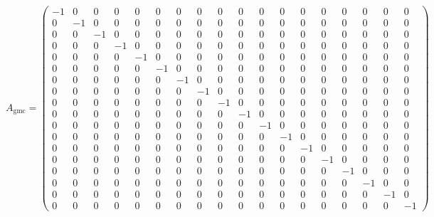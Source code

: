 \begin{landscape}
  \enlargethispage{55pt}
  \begin{equation}
    A_{\mathrm{gmc}}=\left(\begin{array}{rrrrrrrrrrrrrrrrrrrrrrrrrrrrrr}
        -1 & 0 & 0 & 0 & 0 & 0 & 0 & 0 & 0 & 0 & 0 & 0 & 0 & 0 & 0 & 0 & 0 & 0 \\
        0 & -1 & 0 & 0 & 0 & 0 & 0 & 0 & 0 & 0 & 0 & 0 & 0 & 0 & 0 & 0 & 0 & 0 \\
        0 & 0 & -1 & 0 & 0 & 0 & 0 & 0 & 0 & 0 & 0 & 0 & 0 & 0 & 0 & 0 & 0 & 0 \\
        0 & 0 & 0 & -1 & 0 & 0 & 0 & 0 & 0 & 0 & 0 & 0 & 0 & 0 & 0 & 0 & 0 & 0 \\
        0 & 0 & 0 & 0 & -1 & 0 & 0 & 0 & 0 & 0 & 0 & 0 & 0 & 0 & 0 & 0 & 0 & 0 \\
        0 & 0 & 0 & 0 & 0 & -1 & 0 & 0 & 0 & 0 & 0 & 0 & 0 & 0 & 0 & 0 & 0 & 0 \\
        0 & 0 & 0 & 0 & 0 & 0 & -1 & 0 & 0 & 0 & 0 & 0 & 0 & 0 & 0 & 0 & 0 & 0 \\
        0 & 0 & 0 & 0 & 0 & 0 & 0 & -1 & 0 & 0 & 0 & 0 & 0 & 0 & 0 & 0 & 0 & 0 \\
        0 & 0 & 0 & 0 & 0 & 0 & 0 & 0 & -1 & 0 & 0 & 0 & 0 & 0 & 0 & 0 & 0 & 0 \\
        0 & 0 & 0 & 0 & 0 & 0 & 0 & 0 & 0 & -1 & 0 & 0 & 0 & 0 & 0 & 0 & 0 & 0 \\
        0 & 0 & 0 & 0 & 0 & 0 & 0 & 0 & 0 & 0 & -1 & 0 & 0 & 0 & 0 & 0 & 0 & 0 \\
        0 & 0 & 0 & 0 & 0 & 0 & 0 & 0 & 0 & 0 & 0 & -1 & 0 & 0 & 0 & 0 & 0 & 0 \\
        0 & 0 & 0 & 0 & 0 & 0 & 0 & 0 & 0 & 0 & 0 & 0 & -1 & 0 & 0 & 0 & 0 & 0 \\
        0 & 0 & 0 & 0 & 0 & 0 & 0 & 0 & 0 & 0 & 0 & 0 & 0 & -1 & 0 & 0 & 0 & 0 \\
        0 & 0 & 0 & 0 & 0 & 0 & 0 & 0 & 0 & 0 & 0 & 0 & 0 & 0 & -1 & 0 & 0 & 0 \\
        0 & 0 & 0 & 0 & 0 & 0 & 0 & 0 & 0 & 0 & 0 & 0 & 0 & 0 & 0 & -1 & 0 & 0 \\
        0 & 0 & 0 & 0 & 0 & 0 & 0 & 0 & 0 & 0 & 0 & 0 & 0 & 0 & 0 & 0 & -1 & 0 \\
        0 & 0 & 0 & 0 & 0 & 0 & 0 & 0 & 0 & 0 & 0 & 0 & 0 & 0 & 0 & 0 & 0  & -1
    \end{array}\right)
  \end{equation}
\end{landscape}

